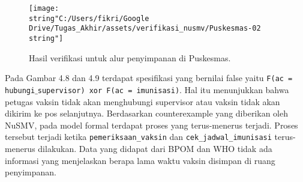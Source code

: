 \begin{figure}[H]
	\begin{centering}
		\texttt{[image: \\string"C:/Users/fikri/Google Drive/Tugas\_Akhir/assets/verifikasi\_nusmv/Puskesmas-02\\string"]}
		\par
	\end{centering}
	
	\caption{Hasil verifikasi untuk alur penyimpanan di Puskesmas.}
	
\end{figure}

Pada Gambar 4.8 dan 4.9 terdapat spesifikasi yang bernilai false yaitu
\texttt{F(ac = hubungi$\_$supervisor) xor F(ac = imunisasi)}. Hal itu
menunjukkan bahwa petugas vaksin tidak akan menghubungi supervisor atau
vaksin tidak akan dikirim ke pos selanjutnya. Berdasarkan counterexample
yang diberikan oleh NuSMV, pada model formal terdapat proses yang
terus-menerus terjadi. Proses tersebut terjadi ketika \texttt{pemeriksaan\_vaksin} dan \texttt{cek\_jadwal\_imunisasi} terus-menerus dilakukan. Data yang
didapat dari BPOM dan WHO tidak ada informasi yang menjelaskan berapa
lama waktu vaksin disimpan di ruang penyimpanan.